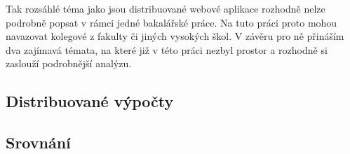 Tak rozsáhlé téma jako jsou distribuované webové aplikace rozhodně nelze podrobně popsat v rámci 
jedné bakalářské práce. Na tuto práci proto mohou navazovat kolegové z fakulty či jiných 
vysokých škol. V závěru pro ně přináším dva zajímavá témata, na které již v této práci 
nezbyl prostor a rozhodně si zaslouží podrobnější analýzu.
 
\subsection{Distribuované výpočty}

\subsection{Srovnání}
